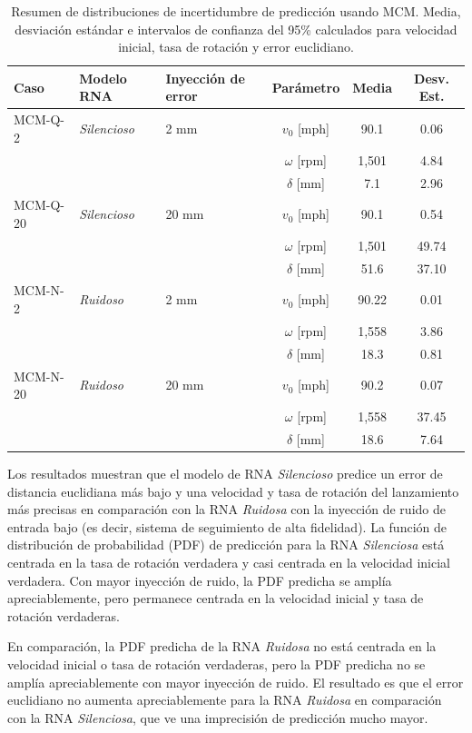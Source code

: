\documentclass[12pt,a4paper]{article}
\begin{document}
\begin{table}[H]
\centering
\caption{Resumen de distribuciones de incertidumbre de predicción usando MCM. Media, desviación estándar e intervalos de confianza del 95\% calculados para velocidad inicial, tasa de rotación y error euclidiano.}
\label{tab:mcm}
\begin{tabular}{@{}lllccc@{}}
\toprule
Caso & Modelo RNA & Inyección de error & Parámetro & Media & Desv. Est. \\
\midrule
MCM-Q-2 & \textit{Silencioso} & 2 mm & $v_0$ [mph] & 90.1 & 0.06 \\
 & & & $\omega$ [rpm] & 1,501 & 4.84 \\
 & & & $\delta$ [mm] & 7.1 & 2.96 \\
\midrule
MCM-Q-20 & \textit{Silencioso} & 20 mm & $v_0$ [mph] & 90.1 & 0.54 \\
 & & & $\omega$ [rpm] & 1,501 & 49.74 \\
 & & & $\delta$ [mm] & 51.6 & 37.10 \\
\midrule
MCM-N-2 & \textit{Ruidoso} & 2 mm & $v_0$ [mph] & 90.22 & 0.01 \\
 & & & $\omega$ [rpm] & 1,558 & 3.86 \\
 & & & $\delta$ [mm] & 18.3 & 0.81 \\
\midrule
MCM-N-20 & \textit{Ruidoso} & 20 mm & $v_0$ [mph] & 90.2 & 0.07 \\
 & & & $\omega$ [rpm] & 1,558 & 37.45 \\
 & & & $\delta$ [mm] & 18.6 & 7.64 \\
\bottomrule
\end{tabular}
\end{table}

Los resultados muestran que el modelo de RNA \textit{Silencioso} predice un error de distancia euclidiana más bajo y una velocidad y tasa de rotación del lanzamiento más precisas en comparación con la RNA \textit{Ruidosa} con la inyección de ruido de entrada bajo (es decir, sistema de seguimiento de alta fidelidad). La función de distribución de probabilidad (PDF) de predicción para la RNA \textit{Silenciosa} está centrada en la tasa de rotación verdadera y casi centrada en la velocidad inicial verdadera. Con mayor inyección de ruido, la PDF predicha se amplía apreciablemente, pero permanece centrada en la velocidad inicial y tasa de rotación verdaderas.

En comparación, la PDF predicha de la RNA \textit{Ruidosa} no está centrada en la velocidad inicial o tasa de rotación verdaderas, pero la PDF predicha no se amplía apreciablemente con mayor inyección de ruido. El resultado es que el error euclidiano no aumenta apreciablemente para la RNA \textit{Ruidosa} en comparación con la RNA \textit{Silenciosa}, que ve una imprecisión de predicción mucho mayor.
\end{document}
